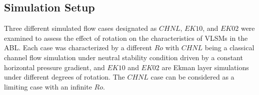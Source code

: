
\subsection{Simulation Setup}

Three different simulated flow cases designated as $CHNL$, $EK10$, and $EK02$ were examined to assess the effect of rotation on the characteristics of VLSMs in the ABL. Each case was characterized by a different $Ro$ with $CHNL$ being a classical channel flow simulation under neutral stability condition driven by a constant horizontal pressure  gradient, and $EK10$ and $EK02$ are Ekman layer simulations under different degrees of rotation. The $CHNL$ case can be considered as a limiting case with an infinite $Ro$. 

